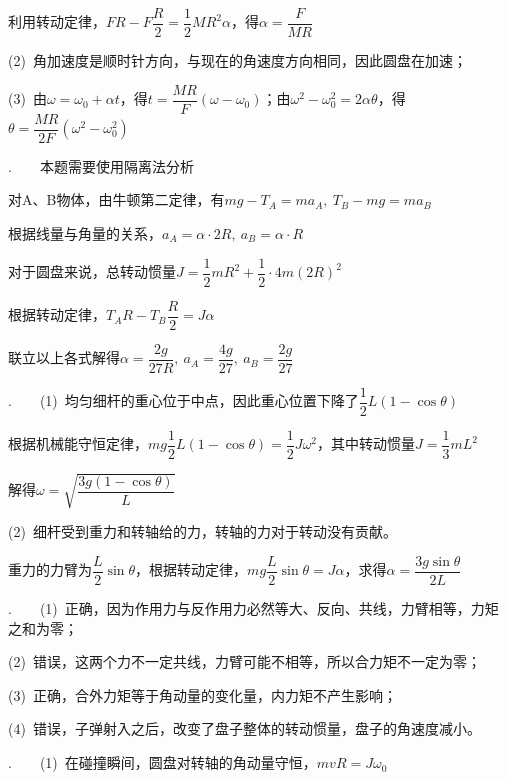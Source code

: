 利用转动定律，$FR-F\dfrac{R}{2}=\dfrac{1}{2}MR^2\alpha$，得$\alpha=\dfrac{F}{MR}$

(2)~角加速度是顺时针方向，与现在的角速度方向相同，因此圆盘在加速；

(3)~由$\omega=\omega_0+\alpha t$，得$t=\dfrac{MR}{F}(\omega-\omega_0)$；由$\omega^2-\omega_0^2=2\alpha \theta$，得$\theta=\dfrac{MR}{2F}(\omega^2-\omega_0^2)$


\newpage

.~~~~本题需要使用隔离法分析

对A、B物体，由牛顿第二定律，有$mg-T_A=ma_A,~T_B-mg=ma_B$

根据线量与角量的关系，$a_A=\alpha \cdot 2R,~a_B=\alpha \cdot R$

对于圆盘来说，总转动惯量$J=\dfrac{1}{2}mR^2+\dfrac{1}{2}\cdot 4m(2R)^2$

根据转动定律，$T_A R-T_B\dfrac{R}{2}=J\alpha$

联立以上各式解得$\alpha=\dfrac{2g}{27R},~a_A=\dfrac{4g}{27},~a_B=\dfrac{2g}{27}$

\noindent\hdashrule{\textwidth}{1pt}{1pt}

.~~~~(1)~均匀细杆的重心位于中点，因此重心位置下降了$\dfrac{1}{2}L(1-\cos{\theta})$

    根据机械能守恒定律，$mg\dfrac{1}{2}L(1-\cos{\theta})=\dfrac{1}{2}J\omega^2$，其中转动惯量$J=\dfrac{1}{3}mL^2$

    解得$\omega=\sqrt{\dfrac{3g(1-\cos{\theta})}{L}}$

    (2)~细杆受到重力和转轴给的力，转轴的力对于转动没有贡献。

    重力的力臂为$\dfrac{L}{2}\sin{\theta}$，根据转动定律，$mg\dfrac{L}{2}\sin{\theta}=J\alpha$，求得$\alpha=\dfrac{3g\sin{\theta}}{2L}$

\noindent\hdashrule{\textwidth}{1pt}{1pt}

.~~~~(1)~正确，因为作用力与反作用力必然等大、反向、共线，力臂相等，力矩之和为零；

(2)~错误，这两个力不一定共线，力臂可能不相等，所以合力矩不一定为零；

(3)~正确，合外力矩等于角动量的变化量，内力矩不产生影响；

(4)~错误，子弹射入之后，改变了盘子整体的转动惯量，盘子的角速度减小。

\noindent\hdashrule{\textwidth}{1pt}{1pt}

.~~~~(1)~在碰撞瞬间，圆盘对转轴的角动量守恒，$mvR=J\omega_0$

